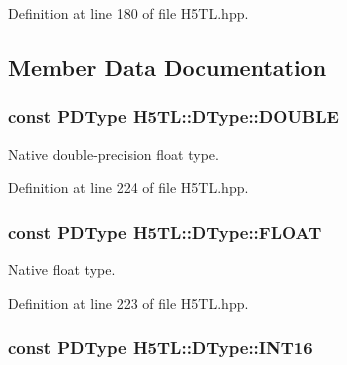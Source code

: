 Definition at line 180 of file H5\-T\-L.\-hpp.



\subsection{Member Data Documentation}
\hypertarget{class_h5_t_l_1_1_d_type_ad17216b2872b91a3ab1ae498fec46773}{
\subsubsection[{D\-O\-U\-B\-L\-E}]{\setlength{\rightskip}{0pt plus 5cm}const {\bf P\-D\-Type} H5\-T\-L\-::\-D\-Type\-::\-D\-O\-U\-B\-L\-E\hspace{0.3cm}{\ttfamily [static]}}}\label{class_h5_t_l_1_1_d_type_ad17216b2872b91a3ab1ae498fec46773}


Native double-\/precision float type. 



Definition at line 224 of file H5\-T\-L.\-hpp.

\hypertarget{class_h5_t_l_1_1_d_type_aa7b15a197d2cc12261708d234eafecf5}{
\subsubsection[{F\-L\-O\-A\-T}]{\setlength{\rightskip}{0pt plus 5cm}const {\bf P\-D\-Type} H5\-T\-L\-::\-D\-Type\-::\-F\-L\-O\-A\-T\hspace{0.3cm}{\ttfamily [static]}}}\label{class_h5_t_l_1_1_d_type_aa7b15a197d2cc12261708d234eafecf5}


Native float type. 



Definition at line 223 of file H5\-T\-L.\-hpp.

\hypertarget{class_h5_t_l_1_1_d_type_a4f605ac6c7ba995aa5cc7f8b4b634029}{
\subsubsection[{I\-N\-T16}]{\setlength{\rightskip}{0pt plus 5cm}const {\bf P\-D\-Type} H5\-T\-L\-::\-D\-Type\-::\-I\-N\-T16\hspace{0.3cm}{\ttfamily [static]}}}\label{class_h5_t_l_1_1_d_type_a4f605ac6c7ba995aa5cc7f8b4b634029}


